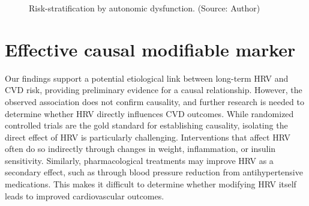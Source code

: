 \documentclass[
  a4paper,
  headsepline=true,
  open=any]{scrbook}
\begin{document}
\begin{figure}

\begin{minipage}[t]{\linewidth}

{\centering 


\caption{Risk-stratification by autonomic dysfunction. (Source: Author)}

}

\end{minipage}%

\end{figure}

\hypertarget{effective-causal-modifiable-marker}{%
\section{Effective causal modifiable
marker}\label{effective-causal-modifiable-marker}}

Our findings support a potential etiological link between long-term HRV
and CVD risk, providing preliminary evidence for a causal relationship.
However, the observed association does not confirm causality, and
further research is needed to determine whether HRV directly influences
CVD outcomes. While randomized controlled trials are the gold standard
for establishing causality, isolating the direct effect of HRV is
particularly challenging. Interventions that affect HRV often do so
indirectly through changes in weight, inflammation, or insulin
sensitivity. Similarly, pharmacological treatments may improve HRV as a
secondary effect, such as through blood pressure reduction from
antihypertensive medications. This makes it difficult to determine
whether modifying HRV itself leads to improved cardiovascular outcomes.
\end{document}
